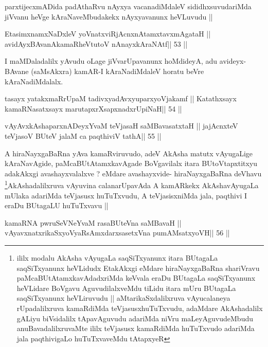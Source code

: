 \begin{artha}
parxtijecxmADida padAthaRvu nAyxya vacanadiMdaleV sididhxsuvudariMda
jiVvanu heVge kAraNaveMbudakekx nAyxyavanunx heVLuvudu ||
\end{artha}

\begin{shl}
EtasimxnamxNaDxleV yoV\s natxviRjAcnxnAtamxtavxmAgataH ||
avidAyxBAvanAkamaRheVtutoV nAnayxkAraNAtf\hfill || 53 ||
\end{shl}

\begin{artha}
I maMDaladalilx yAvudu oLage jiVvarUpavanunx hoMdideyA, adu
avideyx-BAvane (saMsAkxra) kamAR-I kAraNadiMdaleV horatu beVre kAraNadiMdalalx.
\end{artha}

\begin{shl}
tasayx yatakxmaRrUpaM tadivxyadAvxyuparxyoVjakamf ||
Katathxsayx kamaRNasatxsayx marutapxrXsapxnadxrUpiNaH\hfill || 54 ||
\end{shl}

\begin{shl}
vAyAvxkAshaparxnADeyxYvaM teVjasaH saMBavasatxtaH ||
jajAcnxteV teVjasoV BUteV jalaM ca paqthiviV tathA\hfill || 55 ||
\end{shl}

\begin{artha}
A hiraNayxgaBaRna yAva kamaRviruvudo, adeV AkAsha matutx vAyugaLige
kAraNavAgide, paMcaBUtAtamxkavAgade BoVgavilalx itara BUtoVtapxtitxyu
adakAkxgi avashayxvalalxve ? eMdare avashayxvide- hiraNayxgaBaRna
deVhavu \footnote{ililx modalu AkAsha vAyugaLa saqSiTxyanunx itara
BUtagaLa saqSiTxyanunx heVLidudx EtakAkxgi eMdare hiraNayxgaBaRna
shariVravu paMcaBUtAtamxkavAdadxriMda keVvala eraDu BUtagaLa
saqSiTxyanunx heVLidare BoVgavu AguvudilalxveMdu tiLidu itara mUru
BUtagaLa saqSiTxyanunx heVLiruvudu || aMtarikaSxdalilxruva
vAyucalaneya rUpadalilxruva kamaRdiMda teVjasusxhuTuTxvudu, adaMdare
AkAshadalilx gALiyu biVsidalilx tApavAguvudu adariMda niVru
maLeyAguvudeMbudu anuBavadalilxruvaMte ililx teVjasusx kamaRdiMda
huTuTxvudo adariMda jala paqthivigaLo huTuTxvaveMdu tAtapxyeR}AkAshadalilxruva vAyuvina calanarUpavAda A
kamARkekx AkAshavAyugaLa mUlaka adariMda teVjasusx huTuTxvudu, A
teVjasisxniMda jala, paqthivi I eraDu BUtagaLU huTuTxvavu ||
\end{artha}

\begin{shl}
kamaRNA pwruSeVNeYvaM rasaBUteVna saMBavaH ||
vAyavxnatxrikaSxyoVyaRsAmxdarxsasetxVna pumAMsatxyoVH\hfill || 56 ||
\end{shl}

